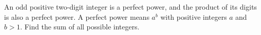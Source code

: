 An odd positive two-digit integer is a perfect power, and the product of its digits is also a perfect power. A perfect power means $a^b$ with positive integers $a$ and $b>1$. Find the sum of all possible integers.
